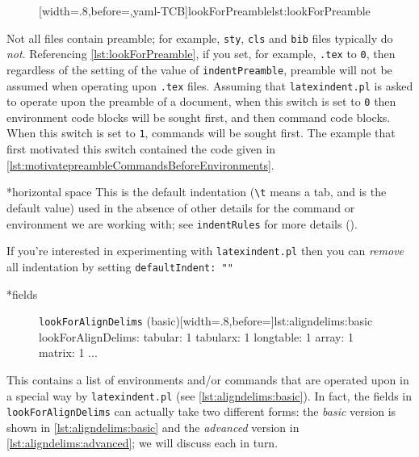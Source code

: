 \documentclass[10pt]{article}
\begin{document}
\begin{figure}
[width=.8\linewidth,before=\centering,yaml-TCB]{lookForPreamble}{lst:lookForPreamble}
\end{figure}
Not all files contain preamble; for example, \texttt{sty}, \texttt{cls} and \texttt{bib} files typically do \emph{not}. Referencing
\cref{lst:lookForPreamble}, if you set, for example, \texttt{.tex} to \texttt{0}, then regardless of the setting of the value of \texttt{indentPreamble}, preamble
will not be assumed when operating upon \texttt{.tex} files.
Assuming that \texttt{latexindent.pl} is asked to operate upon the preamble of a document,
when this switch is set to \texttt{0} then environment code blocks will be sought first, 
and then command code blocks. When this switch is set to \texttt{1}, commands 
will be sought first. The example that first motivated this switch contained the code given in \cref{lst:motivatepreambleCommandsBeforeEnvironments}.


*{horizontal space}
This is the default indentation (\lstinline!\t! means a tab, and is the default value) used in the absence of other details
for the command or environment we are working with; see \texttt{indentRules}
for more details ().

If you're interested in experimenting with \texttt{latexindent.pl} then you
can \emph{remove} all indentation by setting \texttt{defaultIndent: ""}



*{fields}
\begin{figure}
\begin{yaml}[numbers=none]{\texttt{lookForAlignDelims} (basic)}[width=.8\linewidth,before=\centering]{lst:aligndelims:basic}
lookForAlignDelims:
   tabular: 1
   tabularx: 1
   longtable: 1
   array: 1
   matrix: 1
   ...
	\end{yaml}
  \end{figure}
This contains a list of environments and/or commands that 
are operated upon in a special way by \texttt{latexindent.pl} (see \cref{lst:aligndelims:basic}).
In fact, the fields in \texttt{lookForAlignDelims} can actually
take two different forms: the \emph{basic} version is shown in \cref{lst:aligndelims:basic}
and the \emph{advanced} version in \cref{lst:aligndelims:advanced}; we will discuss each in turn.
\end{document}
